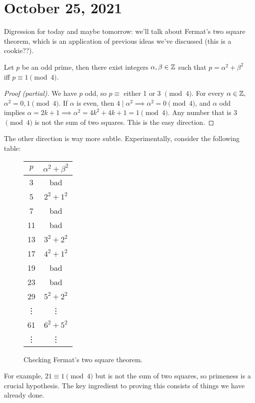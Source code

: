 \section{October 25, 2021} 
Digression for today and maybe tomorrow: we'll talk about Fermat's two square theorem, which is an application of previous ideas we've discussed (this is a cookie??).

\begin{theorem}[Fermat]\label{twosquare} 
   Let $p$ be an odd prime, then there exist integers $\alpha ,\beta \in \mathbb{Z}$ such that $p=\alpha ^2+\beta ^2$ iff $p\equiv 1 \pmod 4$.
\end{theorem}
\begin{proof}[Proof (partial)]
    We have $p$ odd, so $p\equiv$ either 1 or 3 $\pmod 4$. For every $\alpha  \in \mathbb{Z},$ $\alpha ^2=0,1\pmod 4$. If $\alpha $ is even, then $4 \mid \alpha ^2\implies \alpha ^2=0\pmod 4$, and $\alpha $ odd implies $\alpha =2k+1 \implies \alpha ^2= 4k^2+4k+1=1\pmod 4.$ Any number that is 3 $\pmod 4$ is not the sum of two squares. This is the easy direction.
\end{proof}
    The other direction is way more subtle. Experimentally, consider the following table:
    \begin{figure}[H]
       \centering
       \begin{tabular}{c|c} 
           $p$ & $\alpha ^2+\beta ^2$ \\ \hline 
           3 & bad \\
           5 & $2^2+1^2$ \\
           7 & bad \\
           11 & bad \\
           13 & $3^2+2^2$ \\
           17 & $4^2+1^2$ \\
           19 & bad \\
           23 & bad \\
           29 & $5^2+2^2$ \\
           \vdots & \vdots \\
           61 & $6^2+5^2$ \\
           \vdots & \vdots
       \end{tabular}
    \caption{Checking Fermat's two square theorem.} 
    \label{experiment} 
    \end{figure}
    For example, $21\equiv 1 \pmod 4$ but is not the sum of two squares, so primeness is a crucial hypothesis. The key ingredient to proving this consists of things we have already done.
